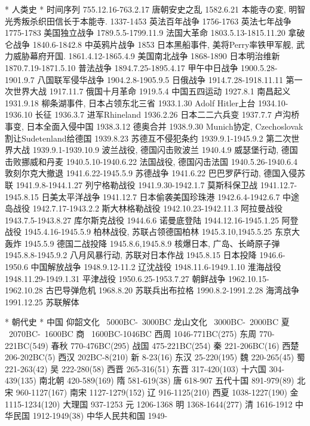* 人类史
	* 时间序列
		755.12.16-763.2.17	唐朝安史之乱
		1582.6.21	本能寺の変, 明智光秀叛杀织田信长于本能寺.
		1337-1453	英法百年战争
		1756-1763	英法七年战争
		1775-1783	美国独立战争
		1789.5.5-1799.11.9	法国大革命
		1803.5.13-1815.11.20	拿破仑战争
		1840.6-1842.8	中英鸦片战争
		1853	日本黑船事件, 美将Perry率铁甲军舰, 武力威胁幕府开国.
		1861.4.12-1865.4.9	美国南北战争
		1868-1890	日本明治维新
		1870.7.19-1871.5.10	普法战争
		1894.7.25-1895.4.17	甲午中日战争
		1900.5.28-1901.9.7	八国联军侵华战争
		1904.2.8-1905.9.5	日俄战争
		1914.7.28-1918.11.11	第一次世界大战
		1917.11.7	俄国十月革命
		1919.5.4	中国五四运动
		1927.8.1	南昌起义
		1931.9.18	柳条湖事件, 日本占领东北三省
		1933.1.30	Adolf Hitler上台
		1934.10-1936.10	长征
		1936.3.7	进军Rhineland
		1936.2.26	日本二二六兵变
		1937.7.7	卢沟桥事变, 日本全面入侵中国
		1938.3.12	德奥合并
		1938.9.30	Munich协定, Czechoslovak割让Sudetenland给德国
		1939.8.23	苏德互不侵犯条约
		1939.9.1-1945.9.2	第二次世界大战
		1939.9.1-1939.10.9	波兰战役, 德国闪击败波兰
		1940.4.9	威瑟堡行动, 德国击败挪威和丹麦
		1940.5.10-1940.6.22	法国战役, 德国闪击法国
		1940.5.26-1940.6.4	敦刻尔克大撤退
		1941.6.22-1945.5.9	苏德战争
		1941.6.22	巴巴罗萨行动, 德国入侵苏联
		1941.9.8-1944.1.27	列宁格勒战役
		1941.9.30-1942.1.7	莫斯科保卫战
		1941.12.7-1945.8.15	日美太平洋战争
		1941.12.7	日本偷袭美国珍珠港
		1942.6.4-1942.6.7	中途岛战役
		1942.7.17-1943.2.2	斯大林格勒战役
		1942.10.23-1942.11.3	阿拉曼战役
		1943.7.5-1943.8.27	库尔斯克战役
		1944.6.6	诺曼底登陆
		1944.12.16-1945.1.25	阿登战役
		1945.4.16-1945.5.9	柏林战役, 苏联占领德国柏林
		1945.3.10,1945.5.25	东京大轰炸
		1945.5.9	德国二战投降
		1945.8.6,1945.8.9	核爆日本, 广岛、长崎原子弹
		1945.8.8-1945.9.2	八月风暴行动, 苏联对日本作战
		1945.8.15	日本投降
		1946.6-1950.6	中国解放战争
		1948.9.12-11.2	辽沈战役
		1948.11.6-1949.1.10	淮海战役
		1948.11.29-1949.1.31	平津战役
		1950.6.25-1953.7.27	朝鲜战争
		1962.10.15-1962.10.28	古巴导弹危机
		1968.8.20	苏联兵出布拉格
		1990.8.2-1991.2.28	海湾战争
		1991.12.25	苏联解体

	* 朝代史
		* 中国
			仰韶文化	~5000BC-~3000BC
			龙山文化	~3000BC-~2000BC
			夏	~2070BC-~1600BC
			商	~1600BC-1046BC
			西周	1046-771BC(275)
			东周	770-221BC(549)
			春秋	770-476BC(295)	
			战国	475-221BC(254)	
			秦	221-206BC(16)
			西楚	206-202BC(5)
			西汉	202BC-8(210)
			新	8-23(16)
			东汉	25-220(195)
			魏	220-265(45)
			蜀	221-263(42)
			吴	222-280(58)
			西晋	265-316(51)
			东晋	317-420(103)
			十六国	304-439(135)	
			南北朝	420-589(169)
			隋	581-619(38)
			唐	618-907
			五代十国	891-979(89)
			北宋	960-1127(167)
			南宋	1127-1279(152)
			辽	916-1125(210)
			西夏	1038-1227(190)
			金	1115-1234(120)
			大理国	937-1253
			元	1206-1368
			明	1368-1644(277)
			清	1616-1912
			中华民国	1912-1949(38)
			中华人民共和国	1949-

